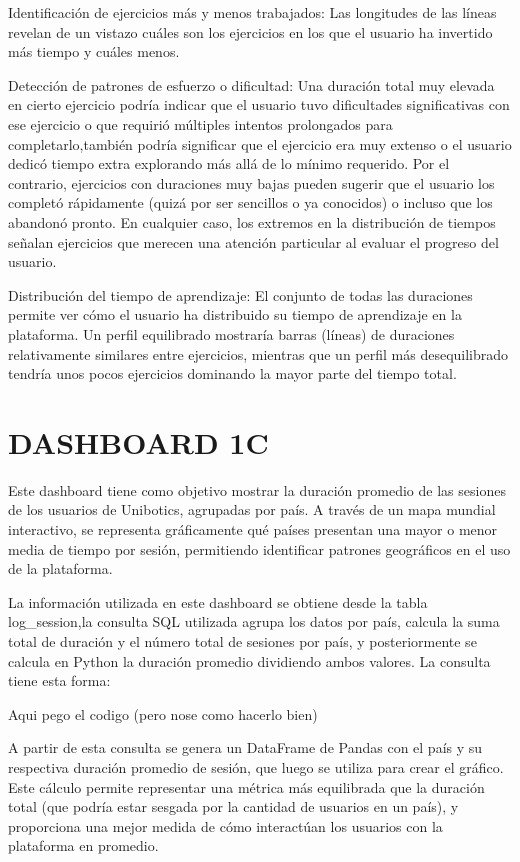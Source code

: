 \documentclass[a4paper, 12pt]{book}
\begin{document}
Identificación de ejercicios más y menos trabajados: Las longitudes de las líneas revelan de un vistazo cuáles son los ejercicios en los que el usuario ha invertido más tiempo y cuáles menos.

Detección de patrones de esfuerzo o dificultad: Una duración total muy elevada en cierto ejercicio podría indicar que el usuario tuvo dificultades significativas con ese ejercicio o que requirió múltiples intentos prolongados para completarlo,también podría significar que el ejercicio era muy extenso o el usuario dedicó tiempo extra explorando más allá de lo mínimo requerido. Por el contrario, ejercicios con duraciones muy bajas pueden sugerir que el usuario los completó rápidamente (quizá por ser sencillos o ya conocidos) o incluso que los abandonó pronto. En cualquier caso, los extremos en la distribución de tiempos señalan ejercicios que merecen una atención particular al evaluar el progreso del usuario.

Distribución del tiempo de aprendizaje: El conjunto de todas las duraciones permite ver cómo el usuario ha distribuido su tiempo de aprendizaje en la plataforma. Un perfil equilibrado mostraría barras (líneas) de duraciones relativamente similares entre ejercicios, mientras que un perfil más desequilibrado tendría unos pocos ejercicios dominando la mayor parte del tiempo total.

\section{DASHBOARD 1C}

Este dashboard tiene como objetivo mostrar la duración promedio de las sesiones de los usuarios de Unibotics, agrupadas por país. A través de un mapa mundial interactivo, se representa gráficamente qué países presentan una mayor o menor media de tiempo por sesión, permitiendo identificar patrones geográficos en el uso de la plataforma.

La información utilizada en este dashboard se obtiene desde la tabla log\_session,la consulta SQL utilizada agrupa los datos por país, calcula la suma total de duración y el número total de sesiones por país, y posteriormente se calcula en Python la duración promedio dividiendo ambos valores. La consulta tiene esta forma:

Aqui pego el codigo (pero nose como hacerlo bien)

A partir de esta consulta se genera un DataFrame de Pandas con el país y su respectiva duración promedio de sesión, que luego se utiliza para crear el gráfico. Este cálculo permite representar una métrica más equilibrada que la duración total (que podría estar sesgada por la cantidad de usuarios en un país), y proporciona una mejor medida de cómo interactúan los usuarios con la plataforma en promedio.
\end{document}
